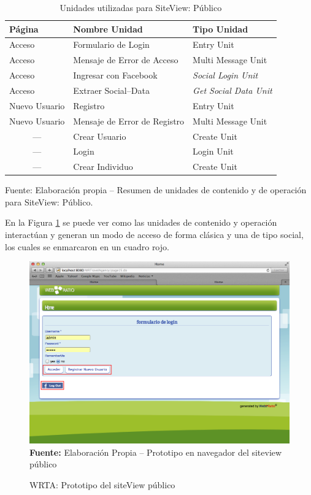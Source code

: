 \documentclass[oneside,12pt,a4paper]{memoir}%
\begin{document}
			\begin{table}[htbp]
			\centering
			\caption{Unidades utilizadas para SiteView: P\'ublico}
				\begin{tabular}{|l|l|l|}
					\hline
					\textbf{P\'agina}	&	\textbf{Nombre Unidad}	&	\textbf{Tipo Unidad}\\\hline 
					Acceso			&	Formulario de Login			&	Entry Unit	\\\hline
					Acceso			&	Mensaje de Error de Acceso	&	Multi Message Unit\\\hline
					Acceso			&	Ingresar con Facebook		&	\textit{Social Login Unit}\\\hline
					Acceso			&	Extraer Social--Data		&	\textit{Get Social Data Unit}\\\hline
					Nuevo Usuario	&	Registro					&	Entry Unit	\\\hline
					Nuevo Usuario	&	Mensaje de Error de Registro&	Multi Message Unit\\\hline
					\multicolumn{1}{|c|}{---}&	Crear Usuario		&	Create Unit	\\\hline
					\multicolumn{1}{|c|}{---}&	Login				&	Login Unit	\\\hline
					\multicolumn{1}{|c|}{---}&	Crear Individuo		&	Create Unit	\\\hline
				\end{tabular}
			\newline
			Fuente: Elaboraci\'on propia -- Resumen de unidades de contenido y de
			operaci\'on para SiteView: P\'ublico.
			\label{tab:svPublico}
			\end{table}
			
			En la Figura \ref{fig:WRTA_paginaPublica} se puede ver como las unidades de
			contenido y operaci\'on interact\'uan y generan un modo de acceso de forma
			cl\'asica y una de tipo social, los cuales se enmarcaron en un cuadro rojo.
			
			\begin{figure}[here]
				\centering
				\caption{WRTA: Prototipo del siteView p\'ublico}
				\includegraphics[width=1.0\textwidth]{figure/fig_WRTA_Publico.png}
				\newline
				\textbf{Fuente:} Elaboraci\'on Propia -- Prototipo en navegador del
				siteview p\'ublico
				\label{fig:WRTA_paginaPublica}
			\end{figure}
			
\end{document}
